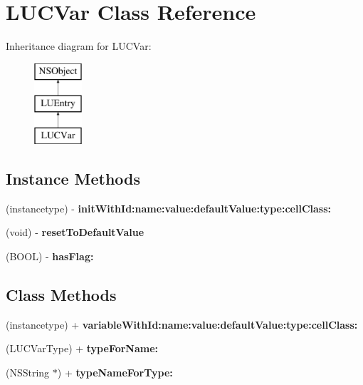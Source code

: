 \hypertarget{interface_l_u_c_var}{}\section{L\+U\+C\+Var Class Reference}
\label{interface_l_u_c_var}
Inheritance diagram for L\+U\+C\+Var\+:\begin{figure}[H]
\begin{center}
\leavevmode
\includegraphics[height=3.000000cm]{interface_l_u_c_var}
\end{center}
\end{figure}
\subsection*{Instance Methods}
\begin{DoxyCompactItemize}
\item 
\mbox{\label{interface_l_u_c_var_a1ef1fcff01348ba4ea8262bdbec94bae}} 
(instancetype) -\/ {\bfseries init\+With\+Id\+:name\+:value\+:default\+Value\+:type\+:cell\+Class\+:}
\item 
\mbox{\label{interface_l_u_c_var_a96df1a36cc4b2b33f027560cd88e615a}} 
(void) -\/ {\bfseries reset\+To\+Default\+Value}
\item 
\mbox{\label{interface_l_u_c_var_a6315efa740ad925d5d91c9f480270fb9}} 
(B\+O\+OL) -\/ {\bfseries has\+Flag\+:}
\end{DoxyCompactItemize}
\subsection*{Class Methods}
\begin{DoxyCompactItemize}
\item 
\mbox{\label{interface_l_u_c_var_a1ff8eb61024ee1a66dde0257b7173cd8}} 
(instancetype) + {\bfseries variable\+With\+Id\+:name\+:value\+:default\+Value\+:type\+:cell\+Class\+:}
\item 
\mbox{\label{interface_l_u_c_var_a89a86e3e7bfca7c11a60553e6268e355}} 
(L\+U\+C\+Var\+Type) + {\bfseries type\+For\+Name\+:}
\item 
\mbox{\label{interface_l_u_c_var_a1afc6c87180140e670ae5e78a92a7e7c}} 
(N\+S\+String $\ast$) + {\bfseries type\+Name\+For\+Type\+:}
\end{DoxyCompactItemize}
